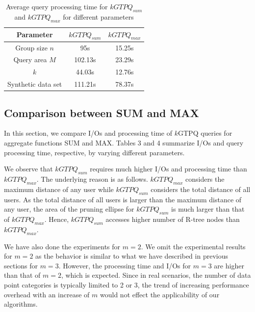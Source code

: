 \begin{table}[htbp]
  \centering
\begin{tabular}{|c|c|c|}
  \hline
  Parameter& $kGTPQ_{sum}$ & $kGTPQ_{max}$\\
  \hline
  Group size $n$ & 95s & 15.25s \\
  \hline
  Query area $M$& 102.13s & 23.29s\\
  \hline
  $k$ & 44.03s & 12.76s\\
  \hline
  Synthetic data set & 111.21s & 78.37s \\
  \hline
\end{tabular}
\caption{Average query processing time for $kGTPQ_{sum}$ and $kGTPQ_{max}$ for different parameters} \label{table:Time} \vspace{-2mm}
\end{table}

\vspace*{10pt}


\subsection{Comparison between SUM and MAX}
\label{subsec:cmp}

In this section, we compare I/Os and processing time of $k$GTPQ queries for aggregate functions SUM and MAX. Tables 3 and 4 summarize I/Os and query processing time, respective, by varying different parameters.

We observe that $kGTPQ_{sum}$ requires much higher I/Os and processing time than $kGTPQ_{max}$. The underlying reason is as follows. $kGTPQ_{max}$ considers the maximum distance of any user while $kGTPQ_{sum}$ considers the total distance of all users. As the total distance of all users is larger than the maximum distance of any user, the area of the pruning ellipse for $kGTPQ_{sum}$ is much larger than that of $kGTPQ_{max}$. Hence, $kGTPQ_{sum}$ accesses higher number of R-tree nodes than $kGTPQ_{max}$.

We have also done the experiments for $m=2$. We omit the experimental results for $m=2$ as the behavior is similar to what we have described in previous sections for $m=3$. However, the processing time and I/Os for $m=3$ are higher than that of $m=2$, which is expected. Since in real scenarios, the number of data point categories is typically limited to 2 or 3, the trend of increasing performance overhead with an increase of $m$ would not effect the applicability of our algorithms.



\endinput 